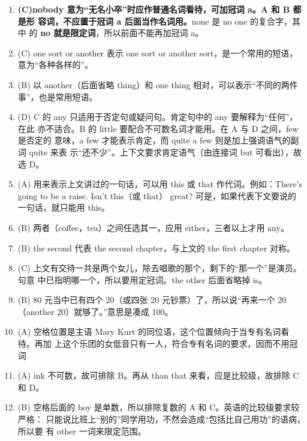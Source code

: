 \begin{enumerate}
\item \textbf{(C)nobody 意为“无名小卒”时应作普通名词看待，可加冠词 a。A 和 B 都是形
    容词，不应置于冠词 a 后面当作名词用。}none 是 no one 的复合字，其中
  的 \textbf{no 就是限定词}，所以前面不能再加冠词 a。

\item (C) one sort or another 表示 one sort or another sort，是一个常用的短语，
  意为“各种各样的”。

\item (B) 以 another（后面省略 thing）和 one thing 相对，可以表示“不同的两件
  事”，也是常用短语。

\item (D) C 的 any 只适用于否定句或疑问句。肯定句中的 any 要解释为“任何”，在此
  亦不适合。B 的 little 要配合不可数名词才能用。在 A 与 D 之间，few 是否定的
  意味，a few 才能表示肯定，而 quite a few 则是加上强调语气的副词 quite 来表
  示“还不少”。上下文要求肯定语气（由连接词 but 可看出），故选 D。

\item (A) 用来表示上文讲过的一句话，可以用 this 或 that 作代词。例如：There's
  going to be a raise. Isn't this（或 that） great? 可是，如果代表下文要说的
  一句话，就只能用 this。

\item (B) 两者（coffee，tea）之间任选其一，应用 either，三者以上才用 any。

\item (B) the second 代表 the second chapter，与上文的 the first chapter 对称。

\item (C) 上文有交待一共是两个女儿，除去唱歌的那个，剩下的“那一个”是演员。句意
  中已指明哪一个，所以要用定冠词。the other 后面省略掉 is。

\item (B) 80 元当中已有四个 20（或四张 20 元钞票）了，所以说“再来一个 20（another 20）就够了。”意思是凑成 100。

\item (A) 空格位置是主语 Mary Kurt 的同位语，这个位置倾向于当专有名词看待。再加
  上这个乐团的女低音只有一人，符合专有名词的要求，因而不用冠词

\item (A) ink 不可数，故可排除 B。再从 than that 来看，应是比较级，故排除 C 和 D。

\item (B) 空格后面的 boy 是单数，所以排除复数的 A 和 C。英语的比较级要求较严格：
  只能说比班上“别的”同学用功，不然会造成“包括比自己用功”的语病，所以要
  有 other 一词来限定范围。


\end{enumerate}
